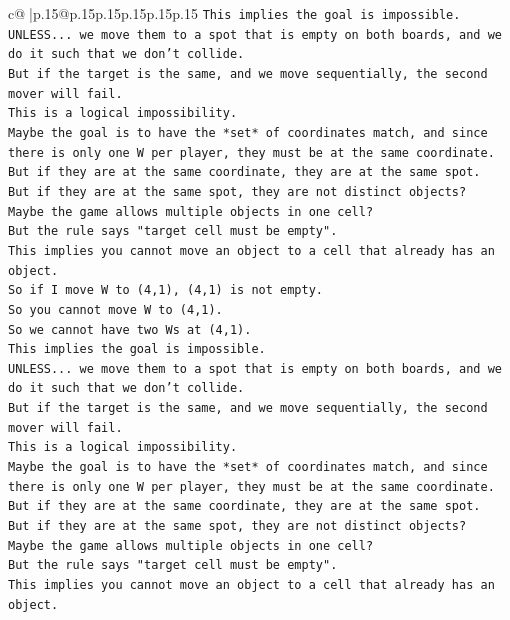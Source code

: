 \documentclass{article}
\begin{document}
{\begin{supertabular}{c@{$\;$}|p{.15\linewidth}@{}p{.15\linewidth}p{.15\linewidth}p{.15\linewidth}p{.15\linewidth}p{.15\linewidth}}
{{{\texttt{This implies the goal is impossible.} \\
\texttt{UNLESS... we move them to a spot that is empty on both boards, and we do it such that we don't collide.} \\
\texttt{But if the target is the same, and we move sequentially, the second mover will fail.} \\
\texttt{This is a logical impossibility.} \\
\texttt{Maybe the goal is to have the *set* of coordinates match, and since there is only one W per player, they must be at the same coordinate.} \\
\texttt{But if they are at the same coordinate, they are at the same spot.} \\
\texttt{But if they are at the same spot, they are not distinct objects?} \\
\texttt{Maybe the game allows multiple objects in one cell?} \\
\texttt{But the rule says "target cell must be empty".} \\
\texttt{This implies you cannot move an object to a cell that already has an object.} \\
\texttt{So if I move W to (4,1), (4,1) is not empty.} \\
\texttt{So you cannot move W to (4,1).} \\
\texttt{So we cannot have two Ws at (4,1).} \\
\texttt{This implies the goal is impossible.} \\
\texttt{UNLESS... we move them to a spot that is empty on both boards, and we do it such that we don't collide.} \\
\texttt{But if the target is the same, and we move sequentially, the second mover will fail.} \\
\texttt{This is a logical impossibility.} \\
\texttt{Maybe the goal is to have the *set* of coordinates match, and since there is only one W per player, they must be at the same coordinate.} \\
\texttt{But if they are at the same coordinate, they are at the same spot.} \\
\texttt{But if they are at the same spot, they are not distinct objects?} \\
\texttt{Maybe the game allows multiple objects in one cell?} \\
\texttt{But the rule says "target cell must be empty".} \\
\texttt{This implies you cannot move an object to a cell that already has an object.} \\
}}}
\end{supertabular}}
\end{document}
